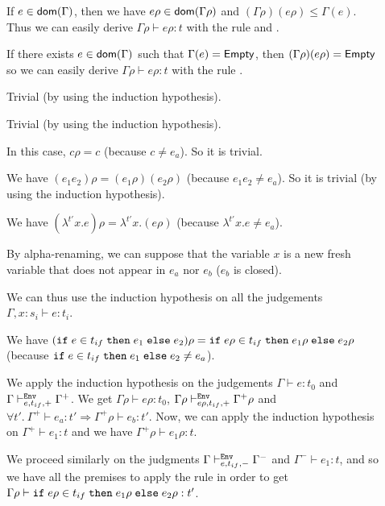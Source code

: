 \documentclass[a4paper]{article}
\theoremstyle{definition}
\begin{document}
        \begin{description}
          \item[] If $e\in\dom\Gamma$, then we have $e\rho\in\dom{\Gamma\rho}$ and $(\Gamma\rho)(e\rho)\leq\Gamma(e)$.
          Thus we can easily derive $\Gamma\rho\vdash e\rho:t$ with the rule  and .
          \item[] If there exists $e\in\dom\Gamma$ such that $\Gamma(e)=\Empty$, then $(\Gamma\rho)(e\rho)=\Empty$
          so we can easily derive $\Gamma\rho\vdash e\rho:t$ with the rule .
          \item[] Trivial (by using the induction hypothesis).
          \item[] Trivial (by using the induction hypothesis).
          \item[] In this case, $c\rho = c$ (because $c \neq e_a$). So it is trivial.
          \item[] We have $(e_1 e_2)\rho = (e_1\rho) (e_2\rho)$ (because $e_1 e_2 \neq e_a$).
          So it is trivial (by using the induction hypothesis).
          \item[] We have $(\lambda^{t'}x.e)\rho = \lambda^{t'}x.(e\rho)$ (because $\lambda^{t'}x.e \neq e_a$).
          
          By alpha-renaming, we can suppose that the variable $x$ is a new fresh variable that does not appear
          in $e_a$ nor $e_b$ ($e_b$ is closed).
          
          We can thus use the induction hypothesis on all the judgements $\Gamma, x:s_i \vdash e:t_i$.
          \item[]
          We have $(\ite e {t_{if}} {e_1} {e_2})\rho = \ite {e\rho} {t_{if}} {e_1\rho} {e_2\rho}$ (because $\ite e {t_{if}} {e_1} {e_2} \neq e_a$).

          We apply the induction hypothesis on the judgements $\Gamma\vdash e:t_0$ and $\Gamma\evdash + e {t_{if}} \Gamma^+$.
          We get $\Gamma\rho\vdash e\rho:t_0$, $\Gamma\rho\evdash + {e\rho} {t_{if}} \Gamma^+\rho$ and
          $\forall t'.\ \Gamma^+ \vdash e_a : t' \Rightarrow \Gamma^+\rho \vdash e_b:t'$.
          Now, we can apply the induction hypothesis on $\Gamma^+\vdash e_1:t$ and we have $\Gamma^+\rho\vdash e_1\rho:t$.

          We proceed similarly on the judgments $\Gamma\evdash - e {t_{if}} \Gamma^-$ and $\Gamma^-\vdash e_1:t$, and so we have all the premises
          to apply the  rule in order to get $\Gamma\rho \vdash \ite {e\rho} {t_{if}} {e_1\rho} {e_2\rho}:t'$. 


\end{description}
\end{document}
